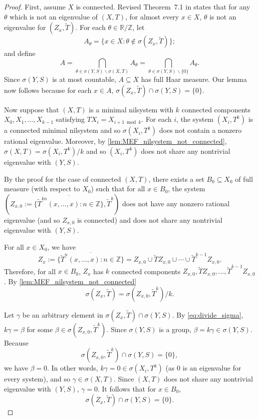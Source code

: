 \documentclass{article}
\theoremstyle{plain}
\theoremstyle{claim}
\theoremstyle{definition}
\theoremstyle{plain}
\theoremstyle{plain}
\newcommand{\Z}{\mathbb{Z}}
\newcommand{\R}{\mathbb{R}}
\renewcommand{\setminus}{\backslash}
\newcommand{\1}{\boldsymbol{1}}
\begin{document}
\begin{proof}
First, assume $X$ is connected. Revised Theorem~7.1 in \cite{Moreira_Richter-spectral} states that for any $\theta$ which is not an eigenvalue of $(X, T)$, for almost every $x \in X$, $\theta$ is not an eigenvalue for $(Z_x, \tilde{T})$. For each $\theta \in \R/\Z$, let 
\[
    A_{\theta} = \{x \in X: \theta \not \in \sigma(Z_x, \tilde{T})\};
\]
and define
\[
    A = \bigcap_{\theta \in \sigma(Y, S) \setminus \sigma(X, T)} A_{\theta} = \bigcap_{\theta \in \sigma(Y, S) \setminus \{0\}} A_{\theta}.
\]
Since $\sigma(Y, S)$ is at most countable, $A \subseteq X$ has full Haar measure. Our lemma now follows because for each $x \in A$, $\sigma(Z_x, \tilde{T}) \cap \sigma(Y, S) = \{0\}$.

Now suppose that $(X, T)$ is a minimal nilsystem with $k$ connected components $X_0, X_1, \ldots, X_{k-1}$ satisfying $T X_i = X_{i + 1 \bmod k}$. For each $i$, the system $(X_i, T^k)$ is a connected minimal nilsystem and so $\sigma(X_i, T^k)$ does not contain a nonzero rational eigenvalue. Moreover, by \cref{lem:MEF_nilsystem_not_connected}, $\sigma(X, T) = \sigma(X_i, T^k)/k$ and so $(X_i, T^k)$ does not share any nontrivial eigenvalue with $(Y, S)$.


By the proof for the case of connected $(X, T)$, there exists a set $B_0 \subseteq X_0$ of full measure (with respect to $X_0$) such that for all $x \in B_0$, the system $(Z_{x,0} := \overline{\{\tilde{T}^{kn}(x, \ldots, x): n \in \Z\}}, \tilde{T}^k)$ does not have any nonzero rational eigenvalue (and so $Z_{x,0}$ is connected) and does not share any nontrivial eigenvalue with $(Y, S)$. 

For all $x \in X_0$, we have
\[
    Z_x := \overline{\{\tilde{T}^n(x, \ldots, x): n \in \Z\}} = Z_{x, 0} \cup \tilde{T} Z_{x, 0} \cup \cdots \cup \tilde{T}^{k-1} Z_{x, 0}.
\]
Therefore, for all $x \in B_0$, $Z_x$ has $k$ connected components $Z_{x, 0}, \tilde{T} Z_{x, 0}, \ldots, \tilde{T}^{k-1} Z_{x, 0}$. By \cref{lem:MEF_nilsystem_not_connected} 
\begin{equation}\label{eq:divide_sigma}
    \sigma(Z_x, \tilde{T}) = \sigma(Z_{x,0}, \tilde{T}^k)/k.
\end{equation}


Let $\gamma$ be an arbitrary element in $\sigma(Z_x, \tilde{T}) \cap \sigma(Y, S)$. By \eqref{eq:divide_sigma}, $k \gamma = \beta$ for some $\beta \in \sigma(Z_{x,0}, \tilde{T}^k)$. Since $\sigma(Y, S)$ is a group, $\beta = k \gamma \in \sigma(Y, S)$.
Because
\[
    \sigma(Z_{x,0}, \tilde{T}^k) \cap \sigma(Y, S) = \{0\},
\]
we have $\beta = 0$. In other words, $k \gamma = 0 \in \sigma(X_i, T^k)$ (as $0$ is an eigenvalue for every system), and so $\gamma \in \sigma(X, T)$. Since $(X, T)$ does not share any nontrivial eigenvalue with $(Y, S)$, $\gamma = 0$. It follows that for $x \in B_0$,
\begin{equation}\label{eq:trivial_eigenspaces}
    \sigma(Z_x, \tilde{T}) \cap \sigma(Y, S) = \{0\}.
\end{equation}


\end{proof}
\end{document}

